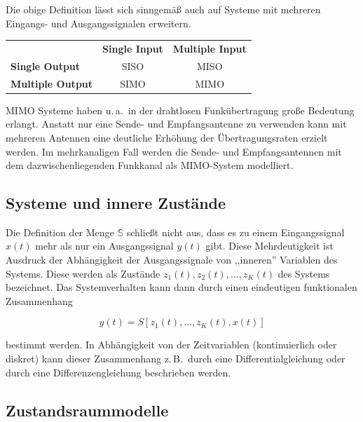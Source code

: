 Die obige Definition lässt sich sinngemäß auch auf Systeme mit mehreren Eingangs- und Ausgangssignalen erweitern.

\begin{center}
\begin{tabular}{lcc}
  & \textbf{Single Input} & \textbf{Multiple Input} \\[4pt]
  \textbf{Single Output}   & SISO & MISO \\[4pt]
  \textbf{Multiple Output} & SIMO & MIMO \\
\end{tabular}
\end{center}

MIMO Systeme haben u.\,a.\ in der drahtlosen Funkübertragung große Bedeutung erlangt. Anstatt nur eine Sende- und Empfangsantenne zu verwenden kann mit mehreren Antennen eine deutliche Erhöhung der Übertragungsraten erzielt werden. Im mehrkanaligen Fall werden die Sende- und Empfangsantennen mit dem dazwischenliegenden Funkkanal als MIMO-System modelliert.

\begin{beispiel}
\end{beispiel}

\subsection{Systeme und innere Zustände}
\label{sec:innere-zustaende}

Die Definition der Menge $\mathbb{S}$ schließt nicht aus, dass es zu einem Eingangssignal $x(t)$ mehr als nur ein Ausgangssignal $y(t)$ gibt. Diese Mehrdeutigkeit ist Ausdruck der Abhängigkeit der Ausgangssignale von ,,inneren'' Variablen des Systems. Diese werden als Zustände $z_1(t), z_2(t), \ldots, z_K(t)$ des Systems bezeichnet. Das Systemverhalten kann dann durch einen eindeutigen funktionalen Zusammenhang

$$
y(t) = S[z_1(t), \ldots, z_K(t), x(t)]
$$

bestimmt werden. In Abhängigkeit von der Zeitvariablen (kontinuierlich oder diskret) kann dieser Zusammenhang z.\,B.\ durch eine Differentialgleichung oder durch eine Differenzengleichung beschrieben werden.


\subsection{Zustandsraummodelle}
\label{sec:zustandsraum}

